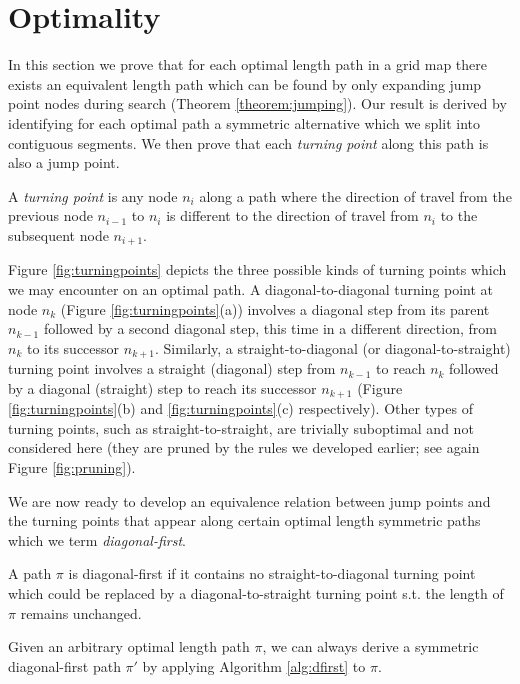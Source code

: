 \section{Optimality}
In this section we prove that for each optimal length path in a grid map there
exists an equivalent length path which can be found by only expanding jump
point nodes during search (Theorem \ref{theorem:jumping}).  Our result is
derived by identifying for each optimal path a symmetric alternative which we
split into contiguous segments. We then prove that each \emph{turning point}
along this path is also a jump point.

\begin{definition}
\label{def:turningpoint}
A \emph{turning point} is any node $n_{i}$ along a path where the direction of
travel from the previous node $n_{i-1}$ to $n_{i}$ is different to the direction
of travel from $n_{i}$ to the subsequent node $n_{i+1}$.
\end{definition}

Figure \ref{fig:turningpoints} depicts the three possible kinds of turning
points which we may encounter on an optimal path. A diagonal-to-diagonal turning
point at node $n_k$ (Figure \ref{fig:turningpoints}(a)) involves a diagonal step
from its parent $n_{k-1}$ followed by a second diagonal step, this time in a
different direction, from $n_{k}$ to its successor $n_{k+1}$.  Similarly, a
straight-to-diagonal (or diagonal-to-straight) turning point involves a straight
(diagonal) step from $n_{k-1}$ to reach $n_{k}$ followed by a diagonal
(straight) step to reach its successor $n_{k+1}$ (Figure
\ref{fig:turningpoints}(b) and \ref{fig:turningpoints}(c) respectively).  
Other types of turning points, such as straight-to-straight, are trivially
suboptimal and not considered here (they are pruned by the rules we developed
earlier; see again Figure \ref{fig:pruning}).

We are now ready to develop an equivalence relation between
jump points and the turning points that appear along certain optimal length 
symmetric paths which we term \emph{diagonal-first}.
 
\begin{definition}
A path $\pi$ is diagonal-first if it contains no straight-to-diagonal turning point
which could be replaced by a diagonal-to-straight turning point s.t.
the length of $\pi$ remains unchanged.
\end{definition}

Given an arbitrary optimal length path $\pi$, we can always derive a symmetric
diagonal-first path $\pi'$ by applying Algorithm \ref{alg:dfirst} to $\pi$.

